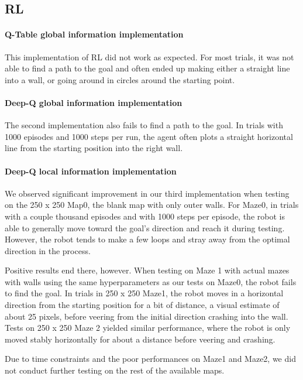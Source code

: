 \documentclass[11pt]{article}
\begin{document}
    \subsection{RL}

        \paragraph{Q-Table global information implementation}
        This implementation of RL did not work as expected. For most trials, it was not able to find a path to the goal and often ended up making either a straight line into a wall, or going around in circles around the starting point.
        
        \paragraph{Deep-Q global information implementation}
        The second implementation also fails to find a path to the goal. In trials with 1000 episodes and 1000 steps per run, the agent often plots a straight horizontal line from the starting position into the right wall. 

        \paragraph{Deep-Q local information implementation}
        We observed significant improvement in our third implementation when testing on the 250 x 250 Map0, the blank map with only outer walls. For Maze0, in trials with a couple thousand episodes and with 1000 steps per episode, the robot is able to generally move toward the goal’s direction and reach it during testing. However, the robot tends to make a few loops and stray away from the optimal direction in the process.

        Positive results end there, however. When testing on Maze 1 with actual mazes with walls using the same hyperparameters as our tests on Maze0, the robot fails to find the goal. In trials in 250 x 250 Maze1, the robot moves in a horizontal direction from the starting position for a bit of distance, a visual estimate of about 25 pixels, before veering from the initial direction crashing into the wall. Tests on 250 x 250 Maze 2 yielded similar performance, where the robot is only moved stably horizontally for about a distance before veering and crashing. 

        Due to time constraints and the poor performances on Maze1 and Maze2, we did not conduct further testing on the rest of the available maps. 
\end{document}
